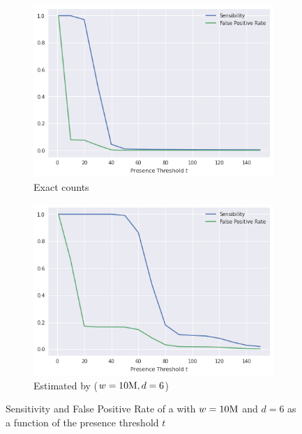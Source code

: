 \begin{figure}[htbp]
    \centering
    \begin{subfigure}{.5\textwidth}
        \centering
        \includegraphics[width=\textwidth]{figures/e_coli-threshold_exploration-K31-exact}
        \caption{Exact counts}\label{fig:ecoli-art-dbcm-threshold-exact}
    \end{subfigure}%
    \begin{subfigure}{.5\textwidth}
        \centering
        \includegraphics[width=\textwidth]{figures/e_coli-threshold_exploration-K31-W10000000-D6}
        \caption{Estimated by \dBCM ($w=10\mega, d=6$)}\label{fig:ecoli-art-dbcm-threshold-estimated}
    \end{subfigure}
    \caption{Sensitivity and False Positive Rate of a \dBCM with $w = 10\mega$ and $d = 6$ as a function of the presence threshold $t$}\label{fig:ecoli-art-dbcm-threshold}
\end{figure}

